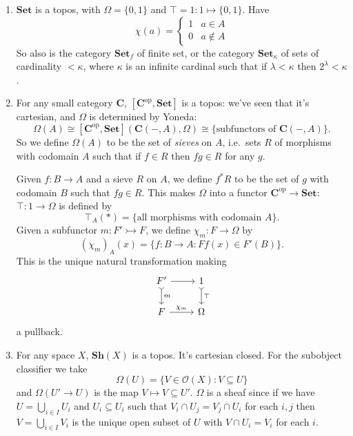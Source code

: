 \documentclass[a4paper]{article}
\renewcommand{\c}[1]{\mathbf{#1}}
\newcommand{\Set}{{\c{Set}}}
\newcommand{\Sh}{{\c{Sh}}}
\newcommand{\mono}{\rightarrowtail}
\begin{document}
\begin{eg}\leavevmode
  \begin{enumerate}
  \item \(\Set\) is a topos, with \(\Omega = \{0, 1\}\) and \(\top = 1: 1 \mapsto \{0, 1\}\). Have
    \[
      \chi(a) =
      \begin{cases}
        1 & a \in A \\
        0 & a \notin A
      \end{cases}
    \]
    So also is the category \(\Set_f\) of finite set, or the category \(\Set_\kappa\) of sets of cardinality \(< \kappa\), where \(\kappa\) is an infinite cardinal such that if \(\lambda < \kappa\) then \(2^\lambda < \kappa\). %
  \item For any small category \(\c C\), \([\c C^{\text{op}}, \Set]\) is a topos: we've seen that it's cartesian, and \(\Omega\) is determined by Yoneda:
    \[
      \Omega(A) \cong [\c C^{\text{op}}, \Set](\c C(-, A), \Omega) \cong \{\text{subfunctors of } \c C(-, A)\}.
    \]
    So we define \(\Omega(A)\) to be the set of \emph{sieves} on \(A\), i.e.\ sets \(R\) of morphisms with codomain \(A\) such that if \(f \in R\) then \(fg \in R\) for any \(g\).

    Given \(f: B \to A\) and a sieve \(R\) on \(A\), we define \(f^*R\) to be the set of \(g\) with codomain \(B\) such that \(fg \in R\). This makes \(\Omega\) into a functor \(\c C^{\text{op}} \to \Set\): \(\top: 1 \to \Omega\) is defined by
    \[
      \top_A(*) = \{\text{all morphisms with codomain } A\}.
    \]
    Given a subfunctor \(m: F' \mono F\), we define \(\chi_m: F \to \Omega\) by
    \[
      (\chi_m)_A(x) = \{f: B \to A: Ff(x) \in F'(B)\}.
    \]
    This is the unique natural transformation making
    \[
      \begin{tikzcd}
        F' \ar[r] \ar[d, "m", tail] & 1 \ar[d, "\top", tail] \\
        F \ar[r, "\chi_m"] & \Omega
      \end{tikzcd}
    \]
    a pullback.
  \item For any space \(X\), \(\Sh(X)\) is a topos. It's cartesian closed. For the subobject classifier we take
    \[
      \Omega(U) = \{V \in \mathcal O(X): V \subseteq U\}
    \]
    and \(\Omega(U' \to U)\) is the map \(V \mapsto V \subseteq U'\). \(\Omega\) is a sheaf since if we have \(U = \bigcup_{i \in I} U_i\) and \(U_i \subseteq U_i\) such that \(V_i \cap U_j = V_j \cap U_i\) for each \(i, j\) then \(V = \bigcup_{i \in I} V_i\) is the unique open subset of \(U\) with \(V \cap U_i = V_i\) for each \(i\).


\end{enumerate}
\end{eg}
\end{document}
